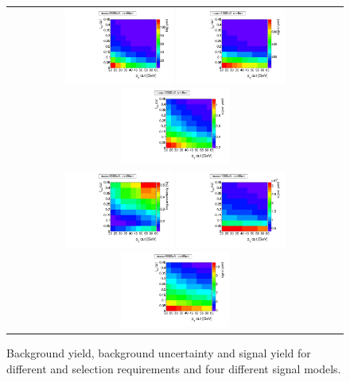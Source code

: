 \begin{figure}[!h]
  \centering 
  \begin{tabular}{c}
    \includegraphics[width=0.33\textwidth]{figures/analysis/Optimisation/BkgYield_ECaloLe5.pdf} 
    \includegraphics[width=0.33\textwidth]{figures/analysis/Optimisation/Madgraph_signal_mass_100_ctau_5cm_ECaloLe5_SignalYield.pdf}
    \includegraphics[width=0.33\textwidth]{figures/analysis/Optimisation/Madgraph_signal_mass_500_ctau_5cm_ECaloLe5_SignalYield.pdf}\\
    \includegraphics[width=0.33\textwidth]{figures/analysis/Optimisation/BkgUncertainty_ECaloLe5.pdf} 
    \includegraphics[width=0.33\textwidth]{figures/analysis/Optimisation/Madgraph_signal_mass_100_ctau_50cm_ECaloLe5_SignalYield.pdf}
    \includegraphics[width=0.33\textwidth]{figures/analysis/Optimisation/Madgraph_signal_mass_500_ctau_50cm_ECaloLe5_SignalYield.pdf}
  \end{tabular}
  \caption{Background yield, background uncertainty and signal yield for different \pt and \ias selection requirements and four different signal models.}
  \label{fig:optimisationApp}
\end{figure} 


